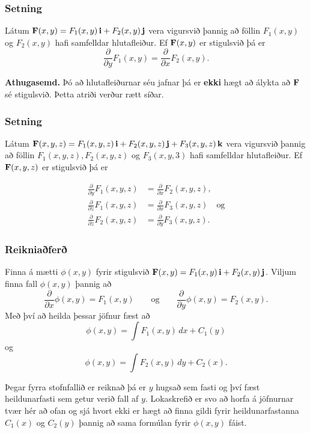 \subsubsection{Setning }
 Látum $\mbox{${\bf F}$}(x,y)=F_1(x,y)\,\mbox{${\bf i}$}+F_2(x,y)\,\mbox{${\bf j}$}$ vera vigursvið þannig að föllin $F_1(x,y)$ og $F_2(x,y)$ hafi samfelldar hlutafleiður.  Ef $\mbox{${\bf F}$}(x,y)$ er stigulsvið þá er 
$$\frac{\partial}{\partial y}F_1(x,y)=
\frac{\partial}{\partial x}F_2(x,y).$$

\smallskip

{\bf Athugasemd.}  Þó að hlutafleiðurnar séu jafnar
þá er {\bf ekki} hægt að álykta að $\mbox{${\bf F}$}$ sé stigulsvið.  Þetta
atriði verður rætt síðar.
 



\subsubsection{Setning }
Látum
$\mbox{${\bf F}$}(x,y,z)=F_1(x,y,z)\,\mbox{${\bf i}$}+F_2(x,y,z)\,\mbox{${\bf j}$}+F_3(x,y,z)\,\mbox{${\bf k}$}$ vera vigursvið
þannig að föllin $F_1(x,y,z), F_2(x,y,z)$ og $F_3(x,y,3)$ hafi
samfelldar hlutafleiður.  Ef $\mbox{${\bf F}$}(x,y,z)$ er stigulsvið þá er  

\begin {align*}
\frac{\partial}{\partial y}F_1(x,y,z) &=
\frac{\partial}{\partial x}F_2(x,y,z), \\
\frac{\partial}{\partial z}F_1(x,y,z) &=
\frac{\partial}{\partial x}F_3(x,y,z) \quad \text{og} \\
\frac{\partial}{\partial z}F_2(x,y,z)&=
\frac{\partial}{\partial y}F_3(x,y,z).
\end {align*}





\subsubsection{Reikniaðferð }
 Finna á mætti $\phi(x,y)$ fyrir stigulsvið  $\mbox{${\bf F}$}(x,y)=F_1(x,y)\,\mbox{${\bf i}$}+F_2(x,y)\,\mbox{${\bf j}$}$.  Viljum finna fall $\phi(x,y)$ þannig að 
$$\frac{\partial}{\partial x}\phi(x,y)=F_1(x,y)\qquad
\mbox{og}\qquad \frac{\partial}{\partial y}\phi(x,y)=F_2(x,y).$$
 Með því að heilda þessar jöfnur fæst að 
 $$\phi(x,y)=\int F_1(x,y)\,dx+C_1(y)$$
og
$$\phi(x,y)=\int F_2(x,y)\,dy+C_2(x).$$

Þegar fyrra stofnfallið er reiknað þá er $y$ hugsað sem fasti og því fæst heildunarfasti sem getur verið fall af $y$.  Lokaskrefið er  svo að horfa á jöfnurnar tvær hér að ofan og sjá hvort ekki er hægt að finna gildi fyrir heildunarfastanna $C_1(x)$ og $C_2(y)$ þannig að sama formúlan fyrir $\phi(x,y)$ fáist.  



